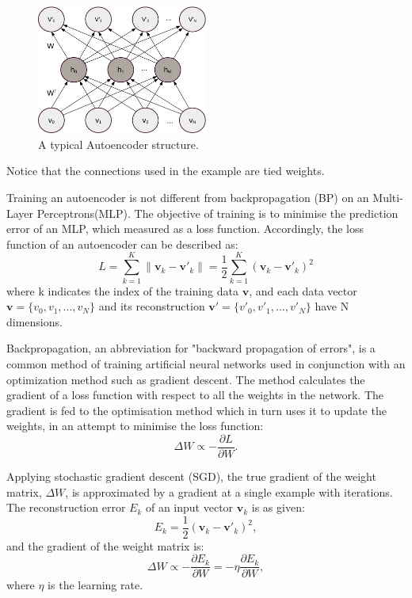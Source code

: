 \begin{figure}
	\centering
	\includegraphics[width=0.5\textwidth]{pics_sdlm/AE.pdf}
	\caption{A typical Autoencoder structure.}
	\label{fig:AE}
\end{figure}

Notice that the connections used in the example are tied weights.

Training an autoencoder is not different from backpropagation (BP) on an Multi-Layer Perceptrons(MLP).
The objective of training is to minimise the prediction error of an MLP, which measured as a loss function.
Accordingly, the loss function of an autoencoder can be described as:
\begin{equation}
L=\sum_{k=1}^{K}\|\mathbf{v}_{k}-\mathbf{v'}_{k}\|=\frac{1}{2}\sum_{k=1}^{K}(\mathbf{v}_{k}-\mathbf{v'}_{k})^{2}
\end{equation}
where k indicates the index of the training data $\mathbf{v}$, and each data vector $\mathbf{v}=\{v_0, v_1,...,v_N\}$ and its reconstruction $\mathbf{v'}=\{v'_0, v'_1,...,v'_N\}$ have N dimensions. 

Backpropagation, an abbreviation for "backward propagation of errors", is a common method of training artificial neural networks used in conjunction with an optimization method such as gradient descent.
The method calculates the gradient of a loss function with respect to all the weights in the network.
The gradient is fed to the optimisation method which in turn uses it to update the weights, in an attempt to minimise the loss function:
\begin{equation}
\Delta W \propto -\frac{\partial L}{\partial W}.
\end{equation}

Applying stochastic gradient descent (SGD), the true gradient of the weight matrix, $\Delta W$, is approximated by a gradient at a single example with iterations.
The reconstruction error $E_k$ of an input vector $\mathbf{v}_k$ is as given:
\begin{equation}
E_k = \frac{1}{2}(\mathbf{v}_k - \mathbf{v'}_k)^2,
\end{equation}
and the gradient of the weight matrix is:
\begin{equation}
\Delta W \propto -\frac{\partial E_k}{\partial W}=-\eta \frac{\partial E_k}{\partial W},
\end{equation}
where $\eta$ is the learning rate.

